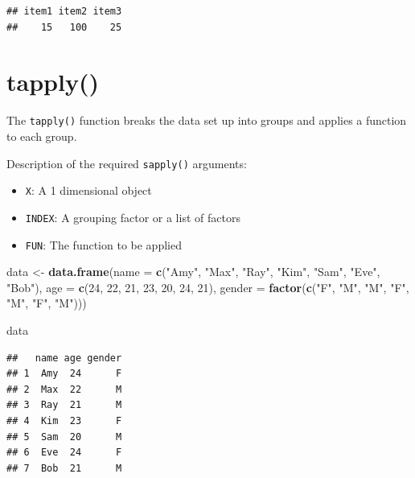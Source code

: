 \documentclass[
]{book}
\newenvironment{Shaded}{\begin{snugshade}}{\end{snugshade}}
\newcommand{\DataTypeTok}[1]{\textcolor[rgb]{0.13,0.29,0.53}{#1}}
\newcommand{\DecValTok}[1]{\textcolor[rgb]{0.00,0.00,0.81}{#1}}
\newcommand{\KeywordTok}[1]{\textcolor[rgb]{0.13,0.29,0.53}{\textbf{#1}}}
\newcommand{\NormalTok}[1]{#1}
\newcommand{\StringTok}[1]{\textcolor[rgb]{0.31,0.60,0.02}{#1}}
\providecommand{\tightlist}{%
  \setlength{\itemsep}{0pt}\setlength{\parskip}{0pt}}
\begin{document}
\begin{verbatim}
## item1 item2 item3 
##    15   100    25
\end{verbatim}

\hypertarget{tapply}{%
\section{tapply()}\label{tapply}}

The \texttt{tapply()} function breaks the data set up into groups and applies a function to each group.

Description of the required \texttt{sapply()} arguments:

\begin{itemize}
\tightlist
\item
  \texttt{X}: A 1 dimensional object
\item
  \texttt{INDEX}: A grouping factor or a list of factors
\item
  \texttt{FUN}: The function to be applied
\end{itemize}

\begin{Shaded}
\begin{Highlighting}[]
\NormalTok{data <-}\StringTok{ }\KeywordTok{data.frame}\NormalTok{(}\DataTypeTok{name =} \KeywordTok{c}\NormalTok{(}\StringTok{"Amy"}\NormalTok{, }\StringTok{"Max"}\NormalTok{, }\StringTok{"Ray"}\NormalTok{, }\StringTok{"Kim"}\NormalTok{, }\StringTok{"Sam"}\NormalTok{,}
    \StringTok{"Eve"}\NormalTok{, }\StringTok{"Bob"}\NormalTok{), }\DataTypeTok{age =} \KeywordTok{c}\NormalTok{(}\DecValTok{24}\NormalTok{, }\DecValTok{22}\NormalTok{, }\DecValTok{21}\NormalTok{, }\DecValTok{23}\NormalTok{, }\DecValTok{20}\NormalTok{, }\DecValTok{24}\NormalTok{, }\DecValTok{21}\NormalTok{), }\DataTypeTok{gender =} \KeywordTok{factor}\NormalTok{(}\KeywordTok{c}\NormalTok{(}\StringTok{"F"}\NormalTok{,}
    \StringTok{"M"}\NormalTok{, }\StringTok{"M"}\NormalTok{, }\StringTok{"F"}\NormalTok{, }\StringTok{"M"}\NormalTok{, }\StringTok{"F"}\NormalTok{, }\StringTok{"M"}\NormalTok{)))}

\NormalTok{data}
\end{Highlighting}
\end{Shaded}

\begin{verbatim}
##   name age gender
## 1  Amy  24      F
## 2  Max  22      M
## 3  Ray  21      M
## 4  Kim  23      F
## 5  Sam  20      M
## 6  Eve  24      F
## 7  Bob  21      M
\end{verbatim}
\end{document}

